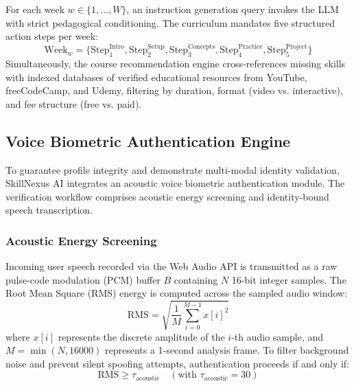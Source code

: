 \documentclass[conference]{IEEEtran}
\begin{document}
For each week $w \in \{1, \dots, W\}$, an instruction generation query invokes the LLM with strict pedagogical conditioning. The curriculum mandates five structured action steps per week:
\begin{equation}
\text{Week}_w = \{\text{Step}_1^{\text{Intro}}, \text{Step}_2^{\text{Setup}}, \text{Step}_3^{\text{Concepts}}, \text{Step}_4^{\text{Practice}}, \text{Step}_5^{\text{Project}}\}
\end{equation}
Simultaneously, the course recommendation engine cross-references missing skills with indexed databases of verified educational resources from YouTube, freeCodeCamp, and Udemy, filtering by duration, format (video vs. interactive), and fee structure (free vs. paid).

\subsection{Voice Biometric Authentication Engine}
To guarantee profile integrity and demonstrate multi-modal identity validation, SkillNexus AI integrates an acoustic voice biometric authentication module. The verification workflow comprises acoustic energy screening and identity-bound speech transcription.

\subsubsection{Acoustic Energy Screening}
Incoming user speech recorded via the Web Audio API is transmitted as a raw pulse-code modulation (PCM) buffer $B$ containing $N$ 16-bit integer samples. The Root Mean Square (RMS) energy is computed across the sampled audio window:
\begin{equation}
\text{RMS} = \sqrt{\frac{1}{M} \sum_{i=0}^{M-1} x[i]^2}
\label{eq:rms}
\end{equation}
where $x[i]$ represents the discrete amplitude of the $i$-th audio sample, and $M = \min(N, 16000)$ represents a 1-second analysis frame. To filter background noise and prevent silent spoofing attempts, authentication proceeds if and only if:
\begin{equation}
\text{RMS} \ge \tau_{\text{acoustic}} \quad (\text{with } \tau_{\text{acoustic}} = 30)
\end{equation}
\end{document}
